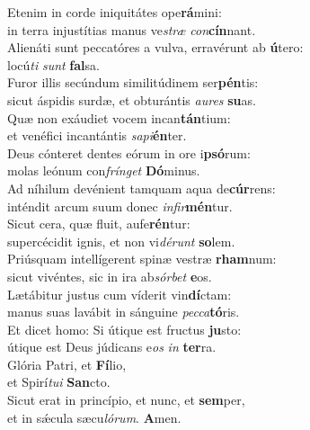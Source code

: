 \evenverse Etenim in corde iniquitátes ope\textbf{rá}mini:~\*\\
\evenverse in terra injustítias manus ve\textit{stræ} \textit{con}\textbf{cín}nant.\\
\oddverse Alienáti sunt peccatóres a vulva, erravérunt ab \textbf{ú}tero:~\*\\
\oddverse locú\textit{ti} \textit{sunt} \textbf{fal}sa.\\
\evenverse Furor illis secúndum similitúdinem ser\textbf{pén}tis:~\*\\
\evenverse sicut áspidis surdæ, et obturántis \textit{au}\textit{res} \textbf{su}as.\\
\oddverse Quæ non exáudiet vocem incan\textbf{tán}tium:~\*\\
\oddverse et venéfici incantántis \textit{sa}\textit{pi}\textbf{én}ter.\\
\evenverse Deus cónteret dentes eórum in ore i\textbf{psó}rum:~\*\\
\evenverse molas leónum con\textit{frín}\textit{get} \textbf{Dó}minus.\\
\oddverse Ad níhilum devénient tamquam aqua de\textbf{cúr}rens:~\*\\
\oddverse inténdit arcum suum donec \textit{in}\textit{fir}\textbf{mén}tur.\\
\evenverse Sicut cera, quæ fluit, aufe\textbf{rén}tur:~\*\\
\evenverse supercécidit ignis, et non vi\textit{dé}\textit{runt} \textbf{so}lem.\\
\oddverse Priúsquam intellígerent spinæ vestræ \textbf{rham}num:~\*\\
\oddverse sicut vivéntes, sic in ira ab\textit{sór}\textit{bet} \textbf{e}os.\\
\evenverse Lætábitur justus cum víderit vin\textbf{dí}ctam:~\*\\
\evenverse manus suas lavábit in sánguine \textit{pec}\textit{ca}\textbf{tó}ris.\\
\oddverse Et dicet homo: Si útique est fructus \textbf{ju}sto:~\*\\
\oddverse útique est Deus júdicans e\textit{os} \textit{in} \textbf{ter}ra.\\
\evenverse Glória Patri, et \textbf{Fí}lio,~\*\\
\evenverse et Spirí\textit{tu}\textit{i} \textbf{San}cto.\\
\oddverse Sicut erat in princípio, et nunc, et \textbf{sem}per,~\*\\
\oddverse et in sǽcula sæcu\textit{ló}\textit{rum}. \textbf{A}men.\\
